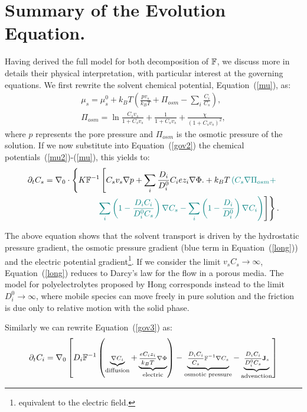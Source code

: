 \section{Summary of the Evolution Equation.}

Having derived the full model for both decomposition of $\mathbb{F}$, we discuss more in details their physical interpretation, with particular interest at the governing equations. We first rewrite the solvent chemical potential, Equation~(\ref{mu}), as:
\begin{gather}
\mu_s = \mu^0_s + k_B T \left(\frac{p v_s}{k_BT} +\Pi_{osm}-\sum_i \frac{C_i}{C_s}\right)\label{mu2},\\
\Pi_{osm}=\ln \frac{C_s v_s}{1+C_s v_s} + \frac{1}{1+C_sv_s}+\frac{\chi}{(1+C_s v_s)^2},
\end{gather}
where $p$ represents the pore pressure and $\Pi_{osm}$ is the osmotic pressure of the solution. If we now substitute into Equation~(\ref{gov2}) the chemical potentials~(\ref{mu2})-(\ref{mu}), this yields to:
\begin{equation}
\begin{aligned}
\partial_t C_s=\nabla_0 \cdot\left\{K\mathbb{F}^{-1}\left[C_s v_s\nabla p +\sum_i \frac{D_i}{D^0_i} C_i e z_i \nabla \Phi.+ k_B T\color{teal} \left(C_s \nabla \Pi_{osm}+  \right.\right.\right.\\
\left.\left.\left.\color{teal} \sum_i\left(1-\frac{D_iC_i}{D^0_iC_s}\right) \nabla C_s- \sum_i\left(1-\frac{D_i}{D^0_i}\right) \nabla C_i \right)\color{black}\right]\right\}.\label{long}
\end{aligned}
\end{equation}

The above equation shows that the solvent transport is driven by the hydrostatic pressure gradient, the osmotic pressure gradient (blue term in Equation~(\ref{long})) and the electric potential gradient\footnote{equivalent to the electric field.}. If we consider the limit $v_sC_s\rightarrow\infty$, Equation~(\ref{long}) reduces to Darcy's law for the flow in a porous media. The model for polyelectrolytes proposed by Hong \cite{Reviewpolyel} corresponds instead to the limit $D^0_i\rightarrow\infty$, where mobile species can move freely in pure solution and the friction is due only to relative motion with the solid phase.

Similarly we can rewrite Equation~(\ref{gov3}) as:
\begin{equation}
\scriptsize
\partial_t C_i = \nabla_0 \left[D_i\mathbb{F}^{-1}\left(\underbrace{\nabla C_i}_{\text{diffusion}} +\underbrace{\frac{eC_iz_i}{k_B T} \nabla \Phi}_{\text{electric}}\right)-\underbrace{\frac{D_i C_i}{C_s}\mathbb{F}^{-1}\nabla C_s}_{\text{osmotic pressure}}-\underbrace{\frac{D_i C_i}{D^0_iC_s}\mathbf{J}_s}_{\text{advenction}}\right]\label{long2}
\end{equation}

